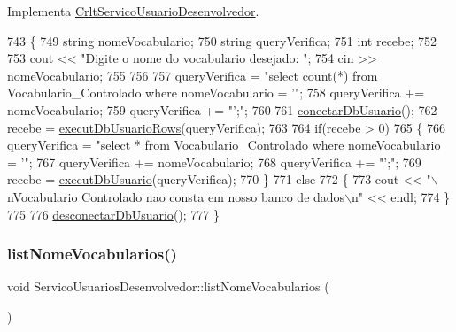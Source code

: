 Implementa \mbox{\hyperlink{class_crlt_servico_usuario_desenvolvedor_a8fb9d062db341aa57ee44ff7b5049652}{Crlt\+Servico\+Usuario\+Desenvolvedor}}.


\begin{DoxyCode}
743 \{
749   \textcolor{keywordtype}{string} nomeVocabulario;
750   \textcolor{keywordtype}{string} queryVerifica;
751   \textcolor{keywordtype}{int} recebe;
752 
753   cout << \textcolor{stringliteral}{"Digite o nome do vocabulario desejado: "};
754   cin >> nomeVocabulario;
755 
756 
757   queryVerifica = \textcolor{stringliteral}{"select count(*) from Vocabulario\_Controlado where nomeVocabulario = '"};
758   queryVerifica += nomeVocabulario;
759   queryVerifica += \textcolor{stringliteral}{"';"};
760 
761   \mbox{\hyperlink{comando_sql_8cpp_a4f89ddcbc4cf8f2587d89f72f8c7900d}{conectarDbUsuario}}();
762   recebe = \mbox{\hyperlink{comando_sql_8cpp_af54952694f2fa7d76f969fb74b853cb9}{executDbUsuarioRows}}(queryVerifica);
763 
764   \textcolor{keywordflow}{if}(recebe > 0)
765       \{
766         queryVerifica = \textcolor{stringliteral}{"select * from Vocabulario\_Controlado where nomeVocabulario = '"};
767         queryVerifica += nomeVocabulario;
768         queryVerifica += \textcolor{stringliteral}{"';"};
769         recebe = \mbox{\hyperlink{comando_sql_8cpp_a748197580e7f9acdbf48c78de1f7924b}{executDbUsuario}}(queryVerifica);
770       \}
771   \textcolor{keywordflow}{else}
772       \{
773         cout << \textcolor{stringliteral}{"\(\backslash\)nVocabulario Controlado nao consta em nosso banco de dados\(\backslash\)n"} << endl;
774       \}
775 
776       \mbox{\hyperlink{comando_sql_8cpp_a969be9911913568e30d4ae8963338bc3}{desconectarDbUsuario}}();
777 \}
\end{DoxyCode}
\mbox{\label{class_servico_usuarios_desenvolvedor_ad4f1b230cdb25ff8a2b8ae0010e99382}} 
\subsubsection{\texorpdfstring{list\+Nome\+Vocabularios()}{listNomeVocabularios()}}
{\footnotesize\ttfamily void Servico\+Usuarios\+Desenvolvedor\+::list\+Nome\+Vocabularios (\begin{DoxyParamCaption}{ }\end{DoxyParamCaption})\hspace{0.3cm}{\ttfamily [virtual]}}

